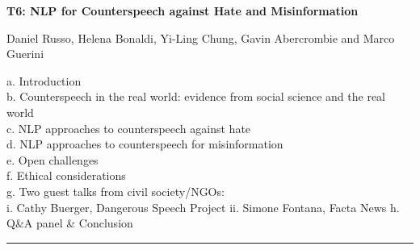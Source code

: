 \begin{center}
    \Large{\textbf{T6: NLP for Counterspeech against Hate and Misinformation}\\}
    \par\bigskip
    \large{Daniel Russo, Helena Bonaldi, Yi-Ling Chung, Gavin Abercrombie and Marco Guerini}\\
    \par\bigskip

\end{center}

a. Introduction\\
b. Counterspeech in the real world: evidence from social science and the real world\\
c. NLP approaches to counterspeech against hate\\
d. NLP approaches to counterspeech for misinformation \\
e. Open challenges \\
f. Ethical considerations \\
g. Two guest talks from civil society/NGOs:\\
    i. Cathy Buerger, Dangerous Speech Project
    ii. Simone Fontana, Facta News
h. Q&A panel \& Conclusion\\

\begin{center}
    \noindent\rule{200px}{1pt}
\end{center}
